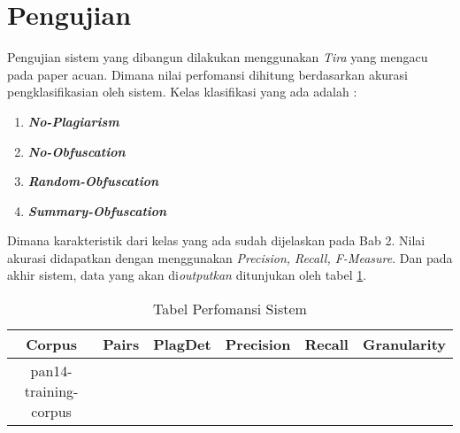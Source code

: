 \documentclass[../Proposal.tex]{subfiles}
\begin{document}
	\section{Pengujian}
	Pengujian sistem yang dibangun dilakukan menggunakan \textit{Tira\cite{tira}} yang mengacu pada paper acuan\cite{mcs-paper,acuan-3}. Dimana nilai perfomansi dihitung berdasarkan akurasi pengklasifikasian oleh sistem. Kelas klasifikasi yang ada adalah :
	
	\begin{enumerate}
		\item \textit{\textbf{No-Plagiarism}}
		\item \textit{\textbf{No-Obfuscation}}
		\item \textit{\textbf{Random-Obfuscation}} 
		\item \textit{\textbf{Summary-Obfuscation}} 
	\end{enumerate}
	
	Dimana karakteristik dari kelas yang ada sudah dijelaskan pada Bab 2. Nilai akurasi didapatkan dengan menggunakan  \textit{Precision, Recall, F-Measure}. Dan pada akhir sistem, data yang akan di\textit{outputkan} ditunjukan oleh tabel \ref{tabel-perfomansi}.
	
	\begin{table}[h!]
		\centering
		\label{tabel-perfomansi}
		\caption{Tabel Perfomansi Sistem}
		\begin{tabular}{ | c | c | c | c | c | c | }
			\hline
			\textbf{Corpus} & \textbf{Pairs} & \textbf{PlagDet} & \textbf{Precision} & \textbf{Recall} & \textbf{Granularity} \\  
			\hline
			pan14-training-corpus &  &  & &  & 
			\\ \hline 
		\end{tabular}
		
		
	\end{table}
\end{document}
